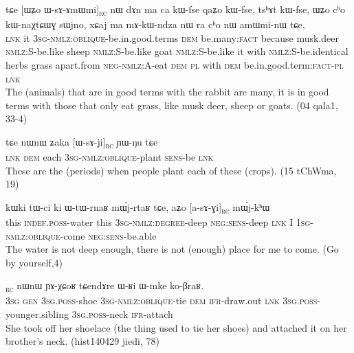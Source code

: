 \documentclass[oldfontcommands,oneside,a4paper,11pt]{article}
\newcommand{\ipa}[1]{{\phon #1}} %
\newcommand{\topic}{\textsc{dem}}
\newcommand{\rc}{\textsubscript{\textsc{rc}}}
\begin{document}
\begin{exe}
   \ex \label{ex:WsAmWmi}
 \gll 
\ipa{tɕe}   	[\ipa{ɯʑo}   	\ipa{ɯ-sɤ-ɤmɯmi}]\rc{}   	\ipa{nɯ}   	\ipa{dɤn}   	\ipa{ma}   	\ipa{ca}   	\ipa{kɯ-fse}   	\ipa{qaʑo}   	\ipa{kɯ-fse,}   	\ipa{tsʰɤt}   	\ipa{kɯ-fse,}   	 \ipa{ɯʑo}   	\ipa{cʰo}   	\ipa{kɯ-naχtɕɯɣ}   	\ipa{sɯjno,}   	\ipa{xɕaj}   	\ipa{ma}   	\ipa{mɤ-kɯ-ndza}   	\ipa{nɯ} \ipa{ra}   	\ipa{cʰo}   	\ipa{nɯ}   	\ipa{amɯmi-nɯ}   	\ipa{tɕe,}   \\
\textsc{lnk} it \textsc{3sg-nmlz:oblique}-be.in.good.terms \topic{} be.many:\textsc{fact} because musk.deer \textsc{nmlz:S}-be.like sheep \textsc{nmlz:S}-be.like goat  \textsc{nmlz:S}-be.like it with  \textsc{nmlz:S}-be.identical herbs grass apart.from \textsc{neg-nmlz:A}-eat \textsc{dem} \textsc{pl} with \textsc{dem} be.in.good.term:\textsc{fact}-\textsc{pl} \textsc{lnk} \\
\glt The (animals) that are in good terms with the rabbit are many, it is in good terms with those that only eat grass, like musk deer, sheep or goats. (04 qala1, 33-4)
\end{exe}

\begin{exe}
   \ex \label{ex:WsAji}
   \gll
   \ipa{tɕe} 	\ipa{nɯnɯ} 	\ipa{ʑaka} 	[\ipa{ɯ-sɤ-ji}]\rc{} 	\ipa{ɲɯ-ŋu} 	\ipa{tɕe}\\
   \textsc{lnk} \textsc{dem} each \textsc{3sg-nmlz:oblique}-plant \textsc{sens}-be \textsc{lnk}\\
\glt These are the (periods) when people plant each of these (crops). (15 tChWma, 19)
\end{exe}

\begin{exe}
   \ex \label{ex:asAGi}
 \gll
\ipa{kɯki}   	\ipa{tɯ-ci}   	\ipa{ki}   	\ipa{ɯ-tɯ-rnaʁ}   	\ipa{mɯ́j-rtaʁ}   	\ipa{tɕe,}   	\ipa{aʑo}   	[\ipa{a-sɤ-ɣi}]\rc{}   	\ipa{mɯ́j-kʰɯ}   \\
this \textsc{indef.poss}-water this \textsc{3sg-nmlz:degree}-deep \textsc{neg:sens}-deep \textsc{lnk} I \textsc{1sg-nmlz:oblique}-come \textsc{neg:sens}-be.able \\
\glt The water is not deep enough, there is not (enough) place for me to come. (Go by yourself,4)
\end{exe}


 \begin{exe}
  \ex  \label{ex:sAxtCAr}  
  \gll [\ipa{ɯʑo} 	\ipa{ɣɯ} 	\ipa{ɯ-xtsa} 	\ipa{ɯ-sɤ-xtɕɤr}]\rc{} 	\ipa{nɯnɯ} 	\ipa{ɲɤ-χɕoʁ} 	\ipa{tɕendɤre} 	\ipa{ɯ-ʁi} 	\ipa{ɯ-mke} 	\ipa{ko-βraʁ.}  \\
\textsc{3sg} \textsc{gen} \textsc{3sg.poss}-shoe \textsc{3sg-nmlz:oblique}-tie \textsc{dem} \textsc{ifr}-draw.out \textsc{lnk} \textsc{3sg.poss}-younger.sibling \textsc{3sg.poss}-neck \textsc{ifr}-attach \\
\glt She took off her shoelace (the thing used to tie her shoes) and attached it on her brother's neck. (hist140429 jiedi, 78)
   \end{exe} 
\end{document}
